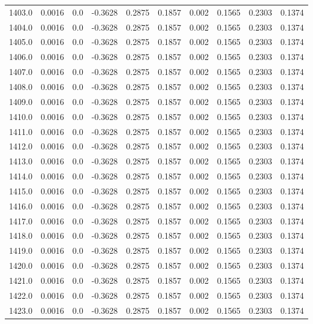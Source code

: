 \begin{longtable}{lrrrrrrrrr}
1403.0 & 0.0016 & 0.0 & -0.3628 & 0.2875 & 0.1857 & 0.002 & 0.1565 & 0.2303 & 0.1374 \\
1404.0 & 0.0016 & 0.0 & -0.3628 & 0.2875 & 0.1857 & 0.002 & 0.1565 & 0.2303 & 0.1374 \\
1405.0 & 0.0016 & 0.0 & -0.3628 & 0.2875 & 0.1857 & 0.002 & 0.1565 & 0.2303 & 0.1374 \\
1406.0 & 0.0016 & 0.0 & -0.3628 & 0.2875 & 0.1857 & 0.002 & 0.1565 & 0.2303 & 0.1374 \\
1407.0 & 0.0016 & 0.0 & -0.3628 & 0.2875 & 0.1857 & 0.002 & 0.1565 & 0.2303 & 0.1374 \\
1408.0 & 0.0016 & 0.0 & -0.3628 & 0.2875 & 0.1857 & 0.002 & 0.1565 & 0.2303 & 0.1374 \\
1409.0 & 0.0016 & 0.0 & -0.3628 & 0.2875 & 0.1857 & 0.002 & 0.1565 & 0.2303 & 0.1374 \\
1410.0 & 0.0016 & 0.0 & -0.3628 & 0.2875 & 0.1857 & 0.002 & 0.1565 & 0.2303 & 0.1374 \\
1411.0 & 0.0016 & 0.0 & -0.3628 & 0.2875 & 0.1857 & 0.002 & 0.1565 & 0.2303 & 0.1374 \\
1412.0 & 0.0016 & 0.0 & -0.3628 & 0.2875 & 0.1857 & 0.002 & 0.1565 & 0.2303 & 0.1374 \\
1413.0 & 0.0016 & 0.0 & -0.3628 & 0.2875 & 0.1857 & 0.002 & 0.1565 & 0.2303 & 0.1374 \\
1414.0 & 0.0016 & 0.0 & -0.3628 & 0.2875 & 0.1857 & 0.002 & 0.1565 & 0.2303 & 0.1374 \\
1415.0 & 0.0016 & 0.0 & -0.3628 & 0.2875 & 0.1857 & 0.002 & 0.1565 & 0.2303 & 0.1374 \\
1416.0 & 0.0016 & 0.0 & -0.3628 & 0.2875 & 0.1857 & 0.002 & 0.1565 & 0.2303 & 0.1374 \\
1417.0 & 0.0016 & 0.0 & -0.3628 & 0.2875 & 0.1857 & 0.002 & 0.1565 & 0.2303 & 0.1374 \\
1418.0 & 0.0016 & 0.0 & -0.3628 & 0.2875 & 0.1857 & 0.002 & 0.1565 & 0.2303 & 0.1374 \\
1419.0 & 0.0016 & 0.0 & -0.3628 & 0.2875 & 0.1857 & 0.002 & 0.1565 & 0.2303 & 0.1374 \\
1420.0 & 0.0016 & 0.0 & -0.3628 & 0.2875 & 0.1857 & 0.002 & 0.1565 & 0.2303 & 0.1374 \\
1421.0 & 0.0016 & 0.0 & -0.3628 & 0.2875 & 0.1857 & 0.002 & 0.1565 & 0.2303 & 0.1374 \\
1422.0 & 0.0016 & 0.0 & -0.3628 & 0.2875 & 0.1857 & 0.002 & 0.1565 & 0.2303 & 0.1374 \\
1423.0 & 0.0016 & 0.0 & -0.3628 & 0.2875 & 0.1857 & 0.002 & 0.1565 & 0.2303 & 0.1374 \\

\end{longtable}
